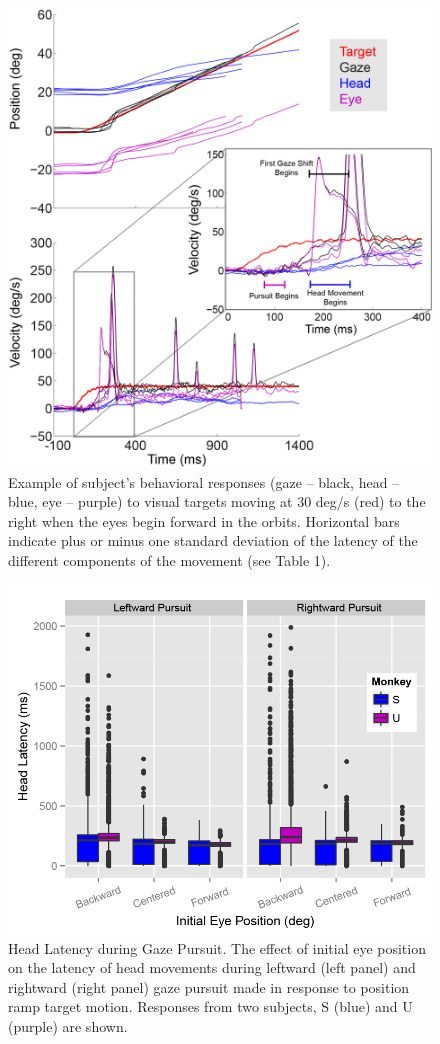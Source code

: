 \documentclass[12pt]{article}
\begin{document}
\begin{figure}[h]
\centering
\includegraphics[width=0.7\linewidth]{./figs/BackwardIEP}
\caption[Behavior with forward IEP]{Example of subject's behavioral responses (gaze – black, head – blue, eye – purple) to visual targets moving at 30 deg/s (red) to the right when the eyes begin forward in the orbits. Horizontal bars indicate plus or minus one standard deviation of the latency of the different components of the movement (see Table 1).}
\label{fig:BackwardIEP}
\end{figure}

\begin{figure}
\centering
\includegraphics[width=0.7\linewidth]{./figs/RampHeadLatency}
\caption[Head latency during ramp trials]{Head Latency during Gaze Pursuit. The effect of initial eye position on the latency of head movements during leftward (left panel) and rightward (right panel) gaze pursuit made in response to position ramp target motion. Responses from two subjects, S (blue) and U (purple) are shown.}
\label{fig:RampHeadLatency}
\end{figure}
\end{document}
